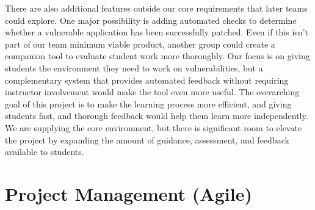 \documentclass[12pt,titlepage]{article}
\begin{document}
There are also additional features outside our core requirements that later teams could explore. One major possibility is adding automated checks to determine whether a vulnerable application has been successfully patched. Even if this isn’t part of our team minimum viable product, another group could create a companion tool to evaluate student work more thoroughly. Our focus is on giving students the environment they need to work on vulnerabilities, but a complementary system that provides automated feedback without requiring instructor involvement would make the tool even more useful. The overarching goal of this project is to make the learning process more efficient, and giving students fast, and thorough feedback would help them learn more independently. We are supplying the core environment, but there is significant room to elevate the project by expanding the amount of guidance, assessment, and feedback available to students.

\section{Project Management (Agile)}
\end{document}
